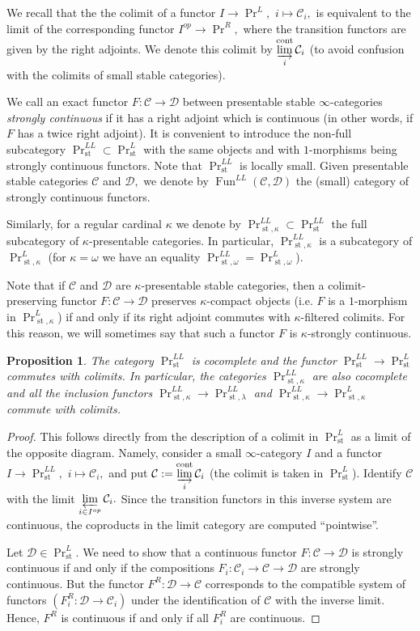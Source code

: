 \documentclass[11pt,leqno]{amsart}
\newtheorem{prop}[theo]{Proposition}
\numberwithin{equation}{section}
\newcommand{\indlim}[1][]{\mathop{\varinjlim}\limits_{#1}}
\newcommand{\prolim}[1][]{\mathop{\varprojlim}\limits_{#1}}
\newcommand{\cont}{\operatorname{cont}}
\newcommand{\st}{\operatorname{st}}
\newcommand{\cD}{{\mathcal D}}
\newcommand{\cC}{{\mathcal C}}
\newcommand{\Fun}{\operatorname{Fun}}
\begin{document}
We recall that the the colimit of a functor $I\to \Pr^L,$ $i\mapsto \cC_i,$ is equivalent to the limit of the corresponding functor $I^{op}\to\Pr^R,$ where the transition functors are given by the right adjoints. We denote this colimit by $\indlim[i]^{\cont}\cC_i$ (to avoid confusion with the colimits of small stable categories). 

We call an exact functor $F:\cC\to\cD$ between presentable stable $\infty$-categories {\it strongly continuous} if it has a right adjoint which is continuous (in other words, if $F$ has a twice right adjoint). It is convenient to introduce the non-full subcategory $\Pr^{LL}_{\st}\subset\Pr^L_{\st}$ with the same objects and with $1$-morphisms being strongly continuous functors. Note that $\Pr^{LL}_{\st}$ is locally small. Given presentable stable categories $\cC$ and $\cD,$ we denote by $\Fun^{LL}(\cC,\cD)$ the (small) category of strongly continuous functors. 

Similarly, for a regular cardinal $\kappa$ we denote by $\Pr^{LL}_{\st,\kappa}\subset \Pr^{LL}_{\st}$ the full subcategory of $\kappa$-presentable categories. In particular, $\Pr^{LL}_{\st,\kappa}$ is a subcategory of $\Pr^L_{\st,\kappa}$ (for $\kappa=\omega$ we have an equality $\Pr^{LL}_{\st,\omega}=\Pr^{L}_{\st,\omega}$).

Note that if $\cC$ and $\cD$ are $\kappa$-presentable stable categories, then a colimit-preserving functor $F:\cC\to\cD$ preserves $\kappa$-compact objects (i.e. $F$ is a $1$-morphism in $\Pr^L_{\st,\kappa}$) if and only if its right adjoint commutes with $\kappa$-filtered colimits. For this reason, we will sometimes say that such a functor $F$ is $\kappa$-strongly continuous. 

\begin{prop}\label{prop:colimits_in_Pr^LL} The category $\Pr^{LL}_{\st}$ is cocomplete and the functor $\Pr^{LL}_{\st}\to \Pr^L_{\st}$ commutes with colimits. In particular, the categories $\Pr^{LL}_{\st,\kappa}$ are also cocomplete and all the inclusion functors $\Pr^{LL}_{\st,\kappa}\to\Pr^{LL}_{\st,\lambda}$ and $\Pr^{LL}_{\st,\kappa}\to\Pr^L_{\st,\kappa}$ commute with colimits.\end{prop}

\begin{proof} This follows directly from the description of a colimit in $\Pr^L_{\st}$ as a limit of the opposite diagram. Namely, consider a small $\infty$-category $I$ and a functor $I\to\Pr^{LL}_{\st},$ $i\mapsto \cC_i,$ and put $\cC:=\indlim[i]^{\cont}\cC_i$ (the colimit is taken in $\Pr^L_{\st}$).  Identify $\cC$ with the limit $\prolim[i\in I^{op}]\cC_i.$ Since the transition functors in this inverse system are continuous, the coproducts in the limit category are computed ``pointwise''. 

Let $\cD\in\Pr^L_{\st}.$ We need to show that a continuous functor $F:\cC\to\cD$ is strongly continuous if and only if the compositions $F_i:\cC_i\to\cC\to\cD$ are strongly continuous. But the functor $F^R:\cD\to\cC$ corresponds to the compatible system of functors $(F_i^R:\cD\to\cC_i)$ under the identification of $\cC$ with the inverse limit. Hence, $F^R$ is continuous if and only if all $F_i^R$ are continuous.\end{proof}
\end{document}

